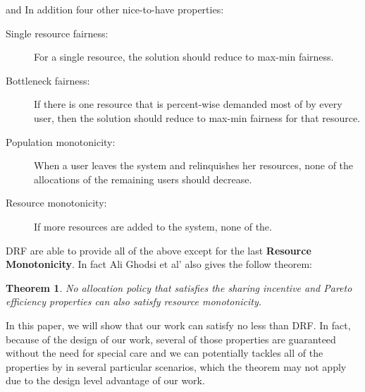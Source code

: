 \documentclass[a4paper,11pt,twocolumn]{article}
\begin{document}
and In addition  four
other nice-to-have properties:

\begin{description}

\item 
[Single resource fairness:] 
For a single resource, the
solution should reduce to max-min fairness.
\item 
[Bottleneck fairness:]
 If there is one resource that is
percent-wise demanded most of by every user, then
the solution should reduce to max-min fairness for
that resource.
\item 
[Population monotonicity:]
When a user leaves the
system and relinquishes her resources, none of the
allocations of the remaining users should decrease.
\item 
[Resource monotonicity:]
If more resources are added
to the system, none of the.
\end{description}

DRF are able to provide all of the above except for the last \textbf{Resource Monotonicity}.
In fact Ali Ghodsi et al' also gives the follow theorem:
\newtheorem{thm}{Theorem}
\begin{thm}
 No allocation policy that satisfies the sharing incentive and Pareto efficiency properties can also
satisfy resource monotonicity.
\end{thm}

In this paper, we will show that our work can satisfy no less than DRF. In fact, because of the design of our work, several of 
those properties are guaranteed without the need for special care and we can   potentially tackles all of the
properties by in several particular scenarios, which the theorem may not apply due to the design level advantage of our work.
\end{document}
